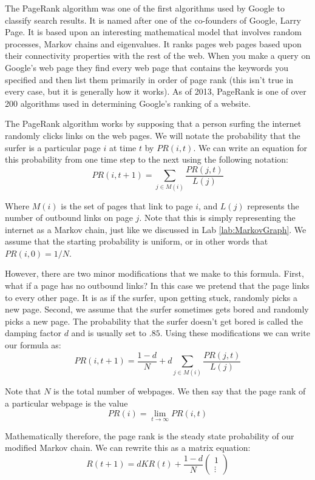 \label{lab:PageRank}

The PageRank algorithm was one of the first algorithms used by Google to classify search results.  It is named after one of the co-founders of Google, Larry Page.  It is based upon an interesting mathematical model that involves random processes, Markov chains and eigenvalues. It ranks pages web pages based upon their connectivity properties with the rest of the web. When you make a query on Google's web page they find every web page that contains the keywords you specified and then list them primarily in order of page rank (this isn't true in every case, but it is generally how it works).  As of 2013, PageRank is one of over 200 algorithms used in determining Google's ranking of a website.

The PageRank algorithm works by supposing that a person surfing the internet randomly clicks links on the web pages. We will notate the probability that the surfer is a particular page $i$ at time $t$ by $PR(i,t)$. We can write an equation for this probability from one time step to the next using the following notation:
\[
PR(i,t+1) = \sum_{j \in M(i)} \frac{PR(j,t)}{L(j)}
\]

Where $M(i)$ is the set of pages that link to page $i$, and $L(j)$ represents the number of outbound links on page $j$. Note that this is simply representing the internet as a Markov chain, just like we discussed in Lab \ref{lab:MarkovGraph}. We assume that the starting probability is uniform, or in other words that $PR(i,0) = 1/N$.

However, there are two minor modifications that we make to this formula. First, what if a page has no outbound links? In this case we pretend that the page links to every other page.  It is as if the surfer, upon getting stuck, randomly picks a new page. Second, we assume that the surfer sometimes gets bored and randomly picks a new page. The probability that the surfer doesn't get bored is called the damping factor $d$ and is usually set to $.85$. Using these modifications we can write our formula as:
\[
PR(i,t+1) = \frac{1-d}{N} + d\sum_{j \in M(i)} \frac{PR(j,t)}{L(j)}
\]

Note that $N$ is the total number of webpages.
We then say that the page rank of a particular webpage is the value
\[PR(i) = \lim_{t\to \infty} PR(i,t)\]

Mathematically therefore, the page rank is the steady state probability of our modified Markov chain.
We can rewrite this as a matrix equation:
\[R(t+1) = d K R(t) + \frac{1-d}{N} \begin{pmatrix}1\\\vdots\end{pmatrix}\]


